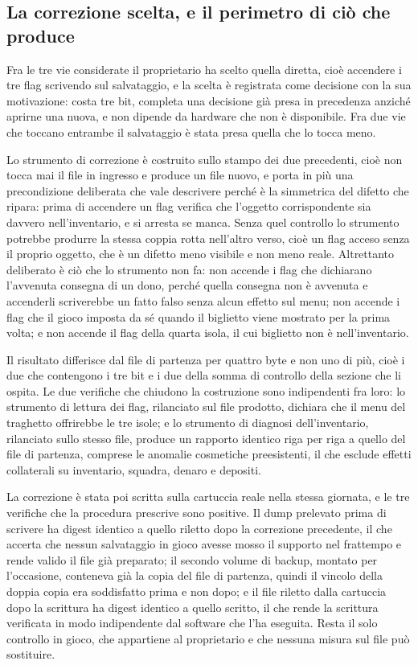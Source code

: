 \subsection{La correzione scelta, e il perimetro di ciò che produce}

Fra le tre vie considerate il proprietario ha scelto quella diretta, cioè accendere i tre flag scrivendo sul salvataggio, e la scelta è registrata come decisione con la sua motivazione: costa tre bit, completa una decisione già presa in precedenza anziché aprirne una nuova, e non dipende da hardware che non è disponibile. Fra due vie che toccano entrambe il salvataggio è stata presa quella che lo tocca meno.

Lo strumento di correzione è costruito sullo stampo dei due precedenti, cioè non tocca mai il file in ingresso e produce un file nuovo, e porta in più una precondizione deliberata che vale descrivere perché è la simmetrica del difetto che ripara: prima di accendere un flag verifica che l'oggetto corrispondente sia davvero nell'inventario, e si arresta se manca. Senza quel controllo lo strumento potrebbe produrre la stessa coppia rotta nell'altro verso, cioè un flag acceso senza il proprio oggetto, che è un difetto meno visibile e non meno reale. Altrettanto deliberato è ciò che lo strumento non fa: non accende i flag che dichiarano l'avvenuta consegna di un dono, perché quella consegna non è avvenuta e accenderli scriverebbe un fatto falso senza alcun effetto sul menu; non accende i flag che il gioco imposta da sé quando il biglietto viene mostrato per la prima volta; e non accende il flag della quarta isola, il cui biglietto non è nell'inventario.

Il risultato differisce dal file di partenza per quattro byte e non uno di più, cioè i due che contengono i tre bit e i due della somma di controllo della sezione che li ospita. Le due verifiche che chiudono la costruzione sono indipendenti fra loro: lo strumento di lettura dei flag, rilanciato sul file prodotto, dichiara che il menu del traghetto offrirebbe le tre isole; e lo strumento di diagnosi dell'inventario, rilanciato sullo stesso file, produce un rapporto identico riga per riga a quello del file di partenza, comprese le anomalie cosmetiche preesistenti, il che esclude effetti collaterali su inventario, squadra, denaro e depositi.

La correzione è stata poi scritta sulla cartuccia reale nella stessa giornata, e le tre verifiche che la procedura prescrive sono positive. Il dump prelevato prima di scrivere ha digest identico a quello riletto dopo la correzione precedente, il che accerta che nessun salvataggio in gioco avesse mosso il supporto nel frattempo e rende valido il file già preparato; il secondo volume di backup, montato per l'occasione, conteneva già la copia del file di partenza, quindi il vincolo della doppia copia era soddisfatto prima e non dopo; e il file riletto dalla cartuccia dopo la scrittura ha digest identico a quello scritto, il che rende la scrittura verificata in modo indipendente dal software che l'ha eseguita. Resta il solo controllo in gioco, che appartiene al proprietario e che nessuna misura sul file può sostituire.

